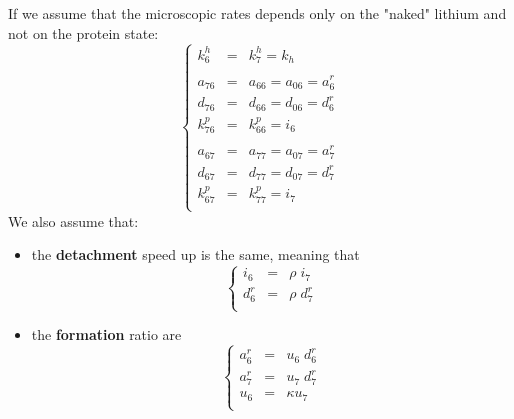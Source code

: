 \documentclass[aps,onecolumn,11pt]{revtex4}
\begin{document}
If we assume that the microscopic rates depends only on the "naked" lithium and not on the protein state:
\begin{equation}
\label{eq:indep}
\left\lbrace
\begin{array}{rcl}
k^h_6    & = & k^h_7 = k_h\\
\\
a_{76}   & = & a_{66} = a_{06} = a^r_6\\
d_{76}   & = & d_{66} = d_{06} = d^r_6\\
k^p_{76} & = & k^p_{66} = i_6\\
\\
a_{67}   & = & a_{77} = a_{07} = a^r_7 \\
d_{67}   & = & d_{77} = d_{07} = d^r_7\\
k^p_{67} & = & k^p_{77} = i_7\\
\end{array}
\right.
\end{equation}
We also assume that:
\begin{itemize}
\item the {\bf detachment} speed up is the same, meaning that
\begin{equation}
\left\lbrace
\begin{array}{rcl}
	i_6 & = & \rho \; i_7\\
	d^r_6 & = & \rho \; d^r_7\\
\end{array}
\right.
\end{equation}
\item the {\bf formation} ratio are
\begin{equation}
\left\lbrace
\begin{array}{rcl}
	a^r_6 & = & u_6 \; d^r_6\\
	a^r_7 & = & u_7 \; d^r_7 \\
	u_6   & = & \kappa u_7 \\
\end{array}
\right.
\end{equation}
\end{itemize}
\end{document}
